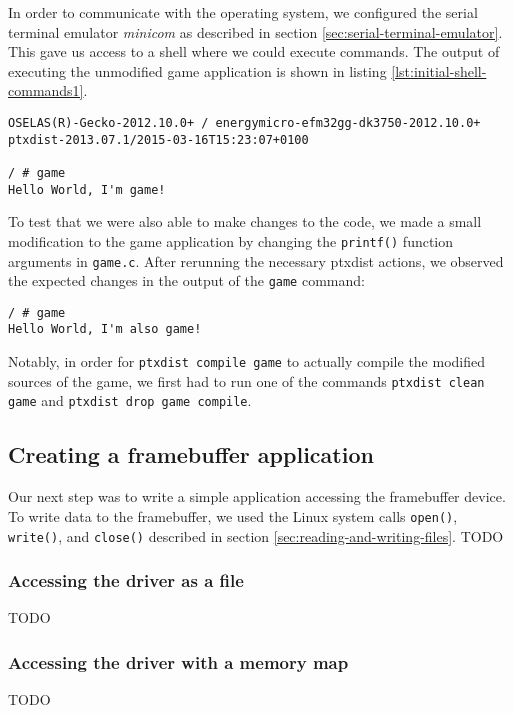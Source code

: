 In order to communicate with the operating system, we configured the serial terminal emulator \emph{minicom} as described in section \ref{sec:serial-terminal-emulator}. This gave us access to a shell where we could execute commands. The output of executing the unmodified game application is shown in listing \ref{lst:initial-shell-commands1}.
\lstset{style=lststyle-terminal}
\begin{lstlisting}[caption=Executing the unmodified game,label=lst:initial-shell-commands1]
OSELAS(R)-Gecko-2012.10.0+ / energymicro-efm32gg-dk3750-2012.10.0+
ptxdist-2013.07.1/2015-03-16T15:23:07+0100

/ # game
Hello World, I'm game!
\end{lstlisting}

To test that we were also able to make changes to the code, we made a small modification to the game application by changing the \texttt{printf()} function arguments in \texttt{game.c}. After rerunning the necessary ptxdist actions, we observed the expected changes in the output of the \texttt{game} command:
\lstset{style=lststyle-terminal}
\begin{lstlisting}[caption=Executing a slightly modified game,label=lst:initial-shell-commands2]
/ # game
Hello World, I'm also game!
\end{lstlisting}
Notably, in order for \texttt{ptxdist compile game} to actually compile the modified sources of the game, we first had to run one of the commands \texttt{ptxdist clean game} and \texttt{ptxdist drop game compile}.

\subsection{Creating a framebuffer application}
Our next step was to write a simple application accessing the framebuffer device. To write data to the framebuffer, we used the Linux system calls \texttt{open()}, \texttt{write()}, and \texttt{close()} described in section \ref{sec:reading-and-writing-files}.
TODO %

\subsubsection{Accessing the driver as a file}
TODO %

\subsubsection{Accessing the driver with a memory map}
TODO %


